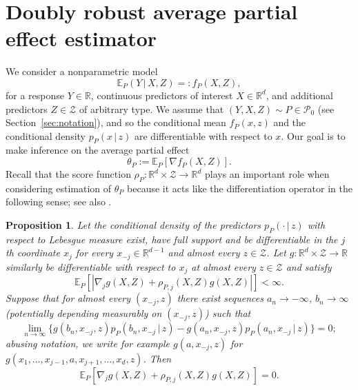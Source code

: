 \documentclass[aos]{imsart}
\newcommand{\R}{\mathbb{R}}
\newcommand{\E}{\mathbb{E}}
\newcommand{\given}{\,|\,}
\newtheorem{proposition}[theorem]{Proposition}
\begin{document}
	\section{Doubly robust average partial effect estimator}
	\label{sect:general}
	
	We consider a nonparametric model
	\begin{equation*}
		\E_P(Y\given  X,Z) =: f_P(X,Z),
	\end{equation*}
	for a response $Y\in \R$, continuous predictors of interest $X\in\R^d$, and additional predictors $Z\in\mathcal{Z}$ of arbitrary type. We assume that $(Y,X,Z)\sim P\in\mathcal{P}_0$ (see Section~\ref{sec:notation}), and so the conditional mean $f_P(x,z)$ and the conditional density $p_P(x\given  z)$ are differentiable with respect to $x$.  Our goal is to make inference on the average partial effect
	\begin{equation*}
		\theta_P := \E_P [ \nabla f_P(X,Z) ].
	\end{equation*}
	Recall that the score function $\rho_P : \R^d \times \mathcal{Z}\to \R^d$ plays an important role when considering estimation of $\theta_P$ because it acts like the differentiation operator in the following sense; see also \citet{StokerIndex, NeweyEfficiency}.
	\begin{proposition}
		\label{prop:intbyparts}
		Let the conditional density of the predictors $p_P(\cdot \given  z)$ with respect to Lebesgue measure exist, have full support and be differentiable in the $j$th coordinate $x_j$ for every $x_{-j} \in \R^{d-1}$ and almost every $z\in\mathcal{Z}$. Let $g:\R^d \times \mathcal{Z}\to \R$ similarly be differentiable with respect to $x_j$ at almost every $z\in\mathcal{Z}$ and satisfy
		\begin{equation} \label{eq:intbyparts}
			\E_P[|\nabla_j g(X,Z) + \rho_{P,j}(X,Z) g(X,Z)|]<\infty.
		\end{equation}
		Suppose that for almost every $(x_{-j}, z)$ there exist sequences $a_n\to -\infty$, $b_n\to\infty$ (potentially depending measurably on $(x_{-j}, z)$) such that
		\begin{equation}
		    \label{eq:boundary}
            \lim_{n\to \infty} \{g(b_n,x_{-j},z)p_P(b_n, x_{-j} \given  z) - g(a_n,x_{-j},z)p_P(a_n, x_{-j} \given  z)\} = 0;
		\end{equation}
		abusing notation, we write for example $g(a, x_{-j}, z)$ for $g(x_1, \ldots, x_{j-1}, a, x_{j+1},\ldots, x_d, z)$. Then
		\begin{equation*}
			\E_P[\nabla_j g(X,Z) + \rho_{P,j}(X,Z)g(X,Z)] = 0.
		\end{equation*}
	\end{proposition}
\end{document}
